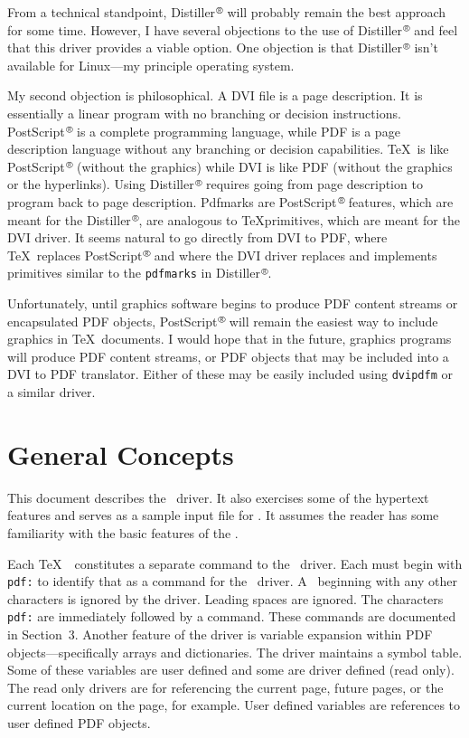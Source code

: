From a technical standpoint,
Distiller$^\rtm$ will probably remain the
best approach for some time.
However, I have several objections to the use of Distiller$^\rtm$
and feel that this driver provides a viable option.
One objection is that Distiller$^\rtm$ isn't available for Linux---my principle
operating system.

My second objection is philosophical.
A DVI file is a page description.
It is essentially a linear program with no branching or decision instructions.
PostScript$^\rtm$ is a complete programming language, while PDF is a page description language
without any branching or decision capabilities.
\TeX\ is like PostScript$^{\rtm}$ (without the graphics)
while DVI is like PDF (without the graphics or the hyperlinks).
Using Distiller$^{\rtm}$ requires going from page description to program back to page description.
Pdfmarks are PostScript$^{\rtm}$ features, which are meant for the Distiller$^{\rtm}$, are
analogous to \TeX \ttspecial primitives, which are meant for the DVI driver.
It seems natural to go directly from DVI to PDF, where \TeX\ replaces
PostScript$^{\rtm}$ and where the DVI driver replaces and implements
\ttspecial primitives similar to the {\tt pdfmarks} in Distiller$^\rtm$.

Unfortunately, until graphics software
begins to produce PDF content streams or encapsulated
PDF objects, PostScript$^{\rtm}$ will remain the easiest
way to include graphics in \TeX\ documents.
I would hope that in the future, graphics programs
will produce PDF content streams, or PDF objects that
may be included into a DVI to PDF translator.  Either
of these may be easily included using {\tt dvipdfm}
or a similar driver.

\section{General Concepts}
This document describes the \dvipdfm\ driver.
It also exercises some of the hypertext features
and serves as a sample input file for
\dvipdfm.
It assumes the reader has some familiarity with the basic features
of the .

Each \TeX\ \ttspecial\ 
constitutes a separate command to the \dvipdfm\ 
driver.  Each \ttspecial must begin with {\tt pdf:}
to identify that \ttspecial as a command for the \dvipdfm\ driver.
A \ttspecial\ beginning with any other characters is ignored
by the driver.  Leading spaces are ignored.  The characters {\tt pdf:}
are immediately followed by a \dvipdfm command.  These commands
are documented in Section~3.  Another feature of the driver
is variable expansion within PDF objects---specifically arrays and
dictionaries.  The driver maintains a symbol table.
Some of these variables are user defined and some are
driver defined (read only).  The read only
drivers are for referencing the current page, future pages,
or the current location on the page, for example.
User defined variables are references to user defined PDF objects.


